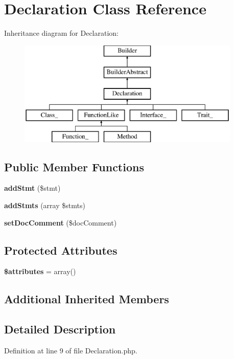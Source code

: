 \section{Declaration Class Reference}
\label{class_php_parser_1_1_builder_1_1_declaration}
Inheritance diagram for Declaration\+:\begin{figure}[H]
\begin{center}
\leavevmode
\includegraphics[height=5.000000cm]{class_php_parser_1_1_builder_1_1_declaration}
\end{center}
\end{figure}
\subsection*{Public Member Functions}
\begin{DoxyCompactItemize}
\item 
{\bf add\+Stmt} (\$stmt)
\item 
{\bf add\+Stmts} (array \$stmts)
\item 
{\bf set\+Doc\+Comment} (\$doc\+Comment)
\end{DoxyCompactItemize}
\subsection*{Protected Attributes}
\begin{DoxyCompactItemize}
\item 
{\bf \$attributes} = array()
\end{DoxyCompactItemize}
\subsection*{Additional Inherited Members}


\subsection{Detailed Description}


Definition at line 9 of file Declaration.\+php.



